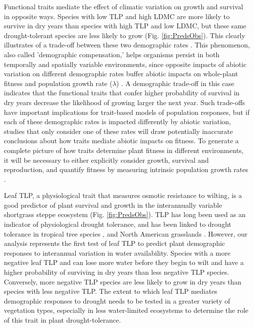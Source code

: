 \documentclass[12pt, letterpaper]{article}
\begin{document}
 Functional traits mediate the effect of climatic variation on growth and survival in opposite ways. Species with low TLP and high LDMC are more likely to survive in dry years than species with high TLP and low LDMC, but these same drought-tolerant species are less likely to grow (Fig. \ref{fig:PredsObs}). This clearly illustrates of a trade-off between these two demographic rates \citep{Laughlin2020TheFitness}. This phenomenon, also called 'demographic compensation,' helps organisms persist in both temporally and spatially variable environments, since opposite impacts of abiotic variation on different demographic rates buffer abiotic impacts on whole-plant fitness and population growth rate ($\lambda$) \citep{Villellas2015DemographicImplications, Doak2010DemographicShifts}. A demographic trade-off in this case indicates that the functional traits that confer higher probability of survival in dry years decrease the likelihood of growing larger the next year. Such trade-offs have important implications for trait-based models of population responses, but if each of these demographic rates is impacted differently by abiotic variation, studies that only consider one of these rates will draw potentially inaccurate conclusions about how traits mediate abiotic impacts on fitness. To generate a complete picture of how traits determine plant fitness in different environments, it will be necessary to either explicitly consider growth, survival and reproduction, and quantify fitness by measuring intrinsic population growth rates \citep{Laughlin2020TheFitness}.  

 Leaf TLP, a physiological trait that measures osmotic resistance to wilting, is a good predictor of plant survival and growth in the interannually variable shortgrass steppe ecosystem (Fig. \ref{fig:PredsObs}). TLP has long been used as an indicator of physiological drought tolerance, and has been linked to drought tolerance in tropical tree species \citep{Bartlett2012}, and North American grasslands \citep{Griffin-Nolan2019, Blumenthal2020, Wilcox2020PlantPrairie}. However, our analysis represents the first test of leaf TLP to predict plant demographic responses to interannual variation in water availability. Species with a more negative leaf TLP and can lose more water before they begin to wilt and have a higher probability  of surviving in dry years than less negative TLP species. Conversely, more negative TLP species are less likely to grow in dry years than species with less negative TLP. The extent to which leaf TLP mediates demographic responses to drought needs to be tested in a greater variety of vegetation types, especially in less water-limited ecosystems to determine the role of this trait in plant drought-tolerance.   
\end{document}
